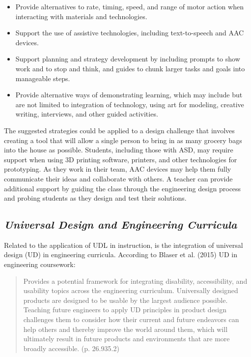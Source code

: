 \documentclass[11.5pt]{sig-alternate}
\begin{document}
\begin{large}
\begin{itemize}
    \item Provide alternatives to rate, timing, speed, and range of motor action when interacting with materials and technologies.
    \item Support the use of assistive technologies, including text-to-speech and AAC devices.
    \item Support planning and strategy development by including prompts to show work and to stop and think, and guides to chunk larger tasks and goals into manageable steps.
    \item Provide alternative ways of demonstrating learning, which may include but are not limited to integration of technology, using art for modeling, creative writing, interviews, and other guided activities.
\end{itemize}

The suggested strategies could be applied to a design challenge that involves creating a tool that will allow a single person to bring in as many grocery bags into the house as possible. Students, including those with ASD, may require support when using 3D printing software, printers, and other technologies for prototyping. As they work in their team, AAC devices may help them fully communicate their ideas and collaborate with others. A teacher can provide additional support by guiding the class through the engineering design process and probing students as they design and test their solutions.  

\subsection*{\textbf{\textit{Universal Design and Engineering Curricula}}}

Related to the application of UDL in instruction, is the integration of universal design (UD) in engineering curricula. According to Blaser et al. (2015) UD in engineering coursework: 

\begin{quotation}
\noindent
    Provides a potential framework for integrating disability, accessibility, and usability topics across the engineering curriculum. Universally designed products are designed to be usable by the largest audience possible. Teaching future engineers to apply UD principles in product design challenges them to consider how their current and future endeavors can help others and thereby improve the world around them, which will ultimately result in future products and environments that are more broadly accessible. (p. 26.935.2)
\end{quotation}


\end{large}
\end{document}
